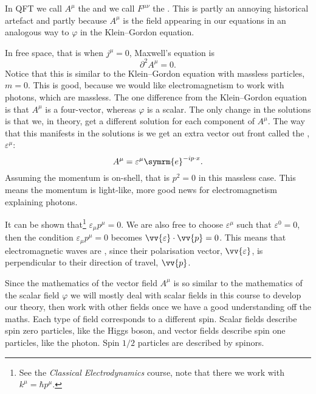\documentclass[fleqn]{NotesClass}
\newcommand*{\course}[1]{\textit{#1}}
\newcommand{\dalembertian}{\partial^2}
\newcommand{\e}{\symrm{e}}
\begin{document}
    In QFT we call \(A^\mu\) the  and we call \(F^{\mu\nu}\) the .
    This is partly an annoying historical artefact and partly because \(A^\mu\) is the field appearing in our equations in an analogous way to \(\varphi\) in the Klein--Gordon equation.
    
    In free space, that is when \(j^\mu = 0\), Maxwell's equation is
    \begin{equation}
        \dalembertian A^\mu = 0.
    \end{equation}
    Notice that this is similar to the Klein--Gordon equation with massless particles, \(m = 0\).
    This is good, because we would like electromagnetism to work with photons, which are massless.
    The one difference from the Klein--Gordon equation is that \(A^\mu\) is a four-vector, whereas \(\varphi\) is a scalar.
    The only change in the solutions is that we, in theory, get a different solution for each component of \(A^\mu\).
    The way that this manifests in the solutions is we get an extra vector out front called the , \(\varepsilon^\mu\):
    \begin{equation}
        A^\mu = \varepsilon^\mu \e^{-ip\cdot x}.
    \end{equation}
    Assuming the momentum is on-shell, that is \(p^2 = 0\) in this massless case.
    This means the momentum is light-like, more good news for electromagnetism explaining photons.
    
    It can be shown that\footnote{See the \course{Classical Electrodynamics} course, note that there we work with \(k^\mu = \hbar p^\mu\).} \(\varepsilon_\mu p^\mu = 0\).
    We are also free to choose \(\varepsilon^\mu\) such that \(\varepsilon^0 = 0\), then the condition \(\varepsilon_\mu p^\mu = 0\) becomes \(\vv{\varepsilon} \cdot \vv{p} = 0\).
    This means that electromagnetic waves are , since their polarisation vector, \(\vv{\varepsilon}\), is perpendicular to their direction of travel, \(\vv{p}\).
    
    Since the mathematics of the vector field \(A^\mu\) is so similar to the mathematics of the scalar field \(\varphi\) we will mostly deal with scalar fields in this course to develop our theory, then work with other fields once we have a good understanding off the maths.
    Each type of field corresponds to a different spin.
    Scalar fields describe spin zero particles, like the Higgs boson, and vector fields describe spin one particles, like the photon.
    Spin \(1/2\) particles are described by spinors.
    
\end{document}
